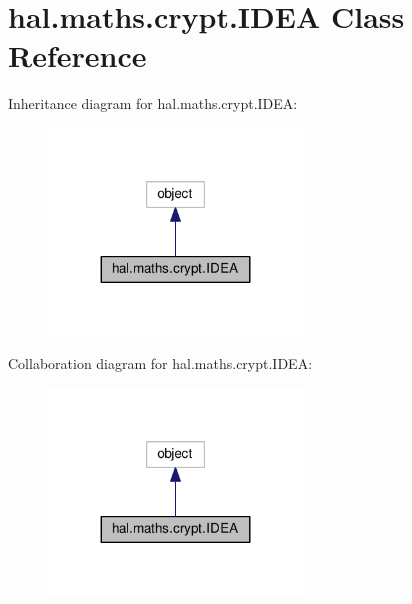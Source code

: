 \hypertarget{classhal_1_1maths_1_1crypt_1_1_i_d_e_a}{}\section{hal.\+maths.\+crypt.\+I\+D\+EA Class Reference}
\label{classhal_1_1maths_1_1crypt_1_1_i_d_e_a}


Inheritance diagram for hal.\+maths.\+crypt.\+I\+D\+EA\+:
\nopagebreak
\begin{figure}[H]
\begin{center}
\leavevmode
\includegraphics[width=191pt]{classhal_1_1maths_1_1crypt_1_1_i_d_e_a__inherit__graph}
\end{center}
\end{figure}


Collaboration diagram for hal.\+maths.\+crypt.\+I\+D\+EA\+:
\nopagebreak
\begin{figure}[H]
\begin{center}
\leavevmode
\includegraphics[width=191pt]{classhal_1_1maths_1_1crypt_1_1_i_d_e_a__coll__graph}
\end{center}
\end{figure}
